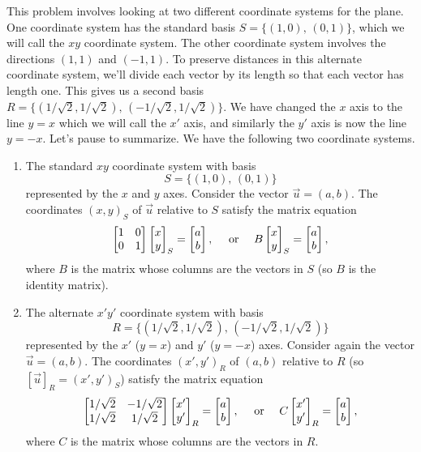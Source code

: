 \begin{example}
This problem involves looking at two different coordinate systems for the plane.  
One coordinate system has the standard basis $S = \{(1,0),\,(0,1)\}$, which we will call the $xy$ coordinate system.  
The other coordinate system involves the directions $(1,1)$ and $(-1,1)$. 
To preserve distances in this alternate coordinate system, we'll divide each vector by its length so that each vector has length one.  
This gives us a second basis $R=\{(1/\sqrt2,1/\sqrt{2}),\, (-1/\sqrt{2},1/\sqrt{2})\}$. 
We have changed the $x$ axis to the line $y=x$ which we will call the $x'$ axis, and similarly the $y'$ axis is now the line $y=-x$.  
Let's pause to summarize.  We have the following two coordinate systems.
\begin{enumerate}
	\item The standard $xy$ coordinate system with basis $$S=\{(1,0),\,(0,1)\}$$ represented by the $x$ and $y$ axes. 
	Consider the vector $\vec u = (a,b)$.  The coordinates $(x,y)_S$ of $\vec u$ relative to $S$ satisfy the matrix equation 
        $$\begin{bmatrix} 1&0\\0&1 \end{bmatrix}\begin{bmatrix} x\\y \end{bmatrix}_{S}=\begin{bmatrix} a\\b \end{bmatrix},\quad \text{ or } \quad B\begin{bmatrix} x\\y \end{bmatrix}_{S}=\begin{bmatrix} a\\b \end{bmatrix},$$
        where $B$ is the matrix whose columns are the vectors in $S$ (so $B$ is the identity matrix).
	\item The alternate $x'y'$ coordinate system with basis $$R=\{(1/\sqrt2,1/\sqrt{2}),\, (-1/\sqrt{2},1/\sqrt{2})\}$$ represented by the $x'$ ($y=x$) and $y'$ ($y=-x$) axes.
	Consider again the vector $\vec u = (a,b)$.  The coordinates $(x',y')_{R}$ of $(a,b)$ relative to $R$ (so $[\vec u]_{R} = (x',y')_S$) satisfy the matrix equation 
	$$\begin{bmatrix} 1/\sqrt2 &-1/\sqrt2\\1/\sqrt2&1/\sqrt2 \end{bmatrix}\begin{bmatrix} x'\\y' \end{bmatrix}_{R}=\begin{bmatrix} a\\b \end{bmatrix}, \quad \text{ or }\quad C\begin{bmatrix} x'\\y' \end{bmatrix}_{R}=\begin{bmatrix} a\\b \end{bmatrix},$$ where $C$ is the matrix whose columns are the vectors in $R$.
\end{enumerate}


\end{example}
